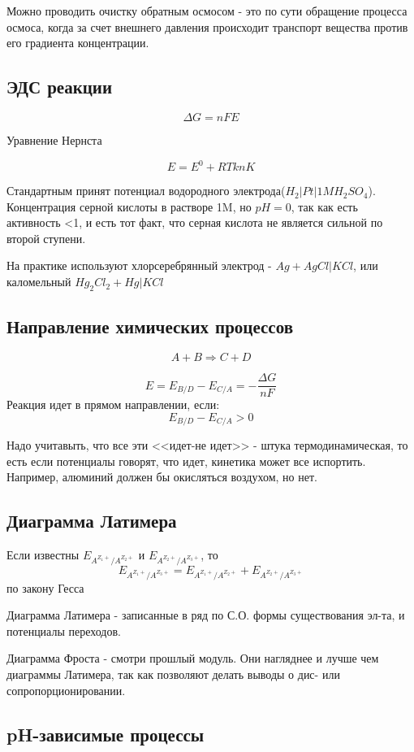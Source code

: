 \documentclass[11pt]{article}
\begin{document}
Можно проводить очистку обратным осмосом - это по сути обращение процесса осмоса, когда за счет внешнего давления происходит транспорт вещества против его градиента концентрации.

\subsection{ЭДС реакции}

$$\Delta G = n F E$$

Уравнение Нернста

$$E = E^0 + RT knK$$

Стандартным принят потенциал водородного электрода($H_2|Pt|1M H_2SO_4$). Концентрация серной кислоты в растворе 1M, но $pH=0$, так как есть активность <1, и есть тот факт, что серная кислота не является сильной по второй ступени.

На практике используют хлорсеребрянный электрод - $Ag+AgCl|KCl$, или каломельный $Hg_2Cl_2+Hg|KCl$

\subsection{Направление химических процессов}
$$A+B \Rightarrow C+D$$

$$E = E_{B/D} - E_{C/A} = -\frac{\Delta G}{nF}$$
Реакция идет в прямом направлении, если:
$$E_{B/D} - E_{C/A}>0 $$

Надо учитавыть, что все эти <<идет-не идет>> - штука термодинамическая, то есть если потенциалы говорят, что идет, кинетика может все испортить. Например, алюминий должен бы окисляться воздухом, но нет. 

\subsection{Диаграмма Латимера}

Если известны  $E_{A^{Z_1+}/A^{Z_2+}}$ и $E_{A^{Z_2+}/A^{Z_3+}}$, то $$E_{A^{Z_1+}/A^{Z_3+}} = E_{A^{Z_1+}/A^{Z_2+}} + E_{A^{Z_2+}/A^{Z_3+}}$$ по закону Гесса

Диаграмма Латимера - записанные в ряд по С.О. формы существования эл-та, и потенциалы переходов.

Диаграмма Фроста - смотри прошлый модуль. Они нагляднее и лучше чем диаграммы Латимера, так как позволяют делать выводы о дис- или сопропорционировании.

\subsection{pH-зависимые процессы}
\end{document}
